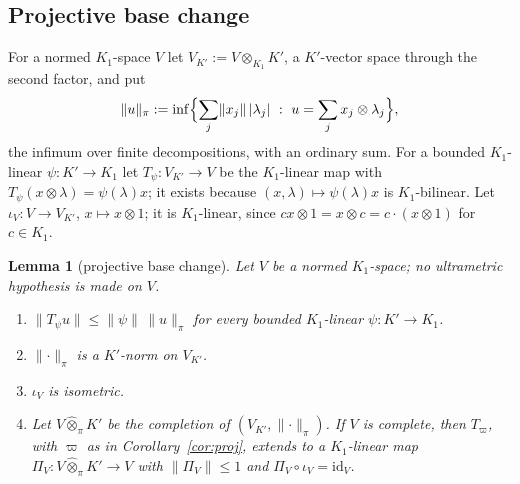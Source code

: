 \documentclass[11pt]{amsart}
\newtheorem{lemma}[theorem]{Lemma}
\theoremstyle{definition}
\theoremstyle{remark}
\numberwithin{equation}{section}
\newcommand{\id}{\mathrm{id}}
\newcommand{\abs}[1]{\lvert #1\rvert}
\newcommand{\norm}[1]{\lVert #1\rVert}
\begin{document}
\subsection{Projective base change}
For a normed $K_1$\nobreakdash-space $V$ let $V_{K'}:=V\otimes_{K_1}K'$, a $K'$\nobreakdash-vector space through the second factor, and put
\[
\norm u_\pi:=\inf\Bigl\{\sum_j\norm{x_j}\,\abs{\lambda_j}\ :\ u=\sum_jx_j\otimes\lambda_j\Bigr\},
\]
the infimum over finite decompositions, with an ordinary sum. For a bounded $K_1$\nobreakdash-linear $\psi\colon K'\to K_1$ let
$T_\psi\colon V_{K'}\to V$ be the $K_1$\nobreakdash-linear map with $T_\psi(x\otimes\lambda)=\psi(\lambda)x$; it exists because
$(x,\lambda)\mapsto\psi(\lambda)x$ is $K_1$\nobreakdash-bilinear. Let $\iota_V\colon V\to V_{K'}$, $x\mapsto x\otimes1$; it is
$K_1$\nobreakdash-linear, since $cx\otimes1=x\otimes c=c\cdot(x\otimes1)$ for $c\in K_1$.

\begin{lemma}[projective base change]\label{lem:bc}
Let $V$ be a normed $K_1$\nobreakdash-space; no ultrametric hypothesis is made on $V$.
\begin{enumerate}
\item $\norm{T_\psi u}\le\norm\psi\,\norm u_\pi$ for every bounded $K_1$\nobreakdash-linear $\psi\colon K'\to K_1$.
\item $\norm\cdot_\pi$ is a $K'$\nobreakdash-norm on $V_{K'}$.
\item $\iota_V$ is isometric.
\item Let $V\widehat\otimes_\pi K'$ be the completion of $(V_{K'},\norm\cdot_\pi)$. If $V$ is complete, then $T_\varpi$, with
$\varpi$ as in Corollary~\ref{cor:proj}, extends to a $K_1$\nobreakdash-linear map $\Pi_V\colon V\widehat\otimes_\pi K'\to V$ with
$\norm{\Pi_V}\le1$ and $\Pi_V\circ\iota_V=\id_V$.
\end{enumerate}
\end{lemma}
\end{document}

